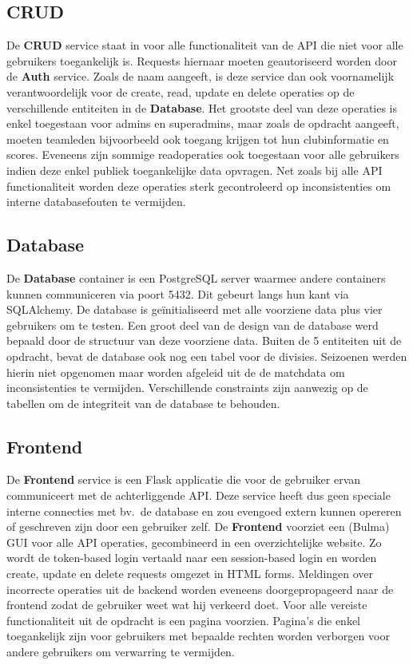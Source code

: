 \documentclass[10pt]{article}
\begin{document}
\subsection{CRUD}
De \textbf{CRUD} service staat in voor alle functionaliteit van de API die niet voor alle gebruikers toegankelijk is. Requests hiernaar moeten geautoriseerd worden door de \textbf{Auth} service. Zoals de naam aangeeft, is deze service dan ook voornamelijk verantwoordelijk voor de create, read, update en delete operaties op de verschillende entiteiten in de \textbf{Database}. Het grootste deel van deze operaties is enkel toegestaan voor admins en superadmins, maar zoals de opdracht aangeeft, moeten teamleden bijvoorbeeld ook toegang krijgen tot hun clubinformatie en scores. Eveneens zijn sommige readoperaties ook toegestaan voor alle gebruikers indien deze enkel publiek toegankelijke data opvragen. Net zoals bij alle API functionaliteit worden deze operaties sterk gecontroleerd op inconsistenties om interne databasefouten te vermijden.
\subsection{Database}
De \textbf{Database} container is een PostgreSQL server waarmee andere containers kunnen communiceren via poort 5432. Dit gebeurt langs hun kant via SQLAlchemy. De database is geïnitialiseerd met alle voorziene data plus vier gebruikers om te testen. Een groot deel van de design van de database werd bepaald door de structuur van deze voorziene data. Buiten de 5 entiteiten uit de opdracht, bevat de database ook nog een tabel voor de divisies. Seizoenen werden hierin niet opgenomen maar worden afgeleid uit de de matchdata om inconsistenties te vermijden. Verschillende constraints zijn aanwezig op de tabellen om de integriteit van de database te behouden.

\subsection{Frontend}
De \textbf{Frontend} service is een Flask applicatie die voor de gebruiker ervan communiceert met de achterliggende API. Deze service heeft dus geen speciale interne connecties met bv.\ de database en zou evengoed extern kunnen opereren of geschreven zijn door een gebruiker zelf. De \textbf{Frontend} voorziet een (Bulma) GUI voor alle API operaties, gecombineerd in een overzichtelijke website. Zo wordt de token-based login vertaald naar een session-based login en worden create, update en delete requests omgezet in HTML forms. Meldingen over incorrecte operaties uit de backend worden eveneens doorgepropageerd naar de frontend zodat de gebruiker weet wat hij verkeerd doet.
Voor alle vereiste functionaliteit uit de opdracht is een pagina voorzien. Pagina's die enkel toegankelijk zijn voor gebruikers met bepaalde rechten worden verborgen voor andere gebruikers om verwarring te vermijden.
\end{document}
